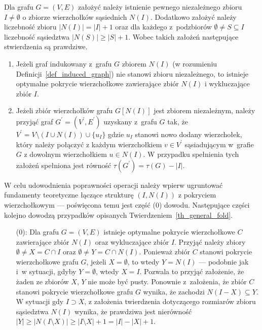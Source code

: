 \par{
  \begin{theorem}
    Dla grafu $G=(V,E)$ założyć należy istnienie pewnego niezależnego zbioru $I\neq \emptyset$ o zbiorze wierzchołków sąsiednich $N(I)$.
    Dodatkowo założyć należy liczebność zbioru $|N(I)|=|I| + 1$ oraz dla każdego z~podzbiorów $\emptyset \neq S \subseteq I$ liczebność sąsiedztwa $|N(S)| \geq |S| + 1$.
    Wobec takich założeń następujące stwierdzenia są prawdziwe.
    \begin{enumerate}
      \item Jeżeli graf indukowany z~grafu $G$ zbiorem $N(I)$ (w rozumieniu Definicji~\ref{def_induced_graph}) nie stanowi zbioru niezależnego, to istnieje optymalne pokrycie wierzchołkowe zawierające zbiór $N(I)$ i wykluczające zbiór $I$.
      \item Jeżeli zbiór wierzchołków grafu $G[N(I)]$ jest zbiorem niezależnym, należy przyjąć graf $G^\prime=(V^\prime, E^\prime)$ uzyskany z~grafu $G$ tak, że $V^\prime=V \setminus (I \cup N(I)) \cup \{u_I\}$ gdzie $u_I$ stanowi nowo dodany wierzchołek, który należy połączyć z każdym wierzchołkiem $v \in V^\prime$ sąsiadującym w~grafie $G$ z dowolnym wierzchołkiem $u \in N(I)$.
      W przypadku spełnienia tych założeń spełniona jest równość $\tau(G^\prime)=\tau(G)-|I|$.
    \end{enumerate}
  \end{theorem}
  \begin{bproof} W celu udowodnienia poprawności operacji należy wpierw ugruntować fundamenty teoretyczne łączące strukturę $(I, N(I))$ z pokryciem wierzchołkowym --- poświęcona temu jest część (0) dowodu.
    Następujące części kolejno dowodzą przypadków opisanych Twierdzeniem~\ref{th_general_fold}.
    \begin{itemize}
      \item[(0):] Dla grafu $G=(V, E)$ istnieje optymalne pokrycie wierzchołkowe $C$ zawierające zbiór $N(I)$ oraz wykluczające zbiór $I$.
      Przyjąć należy zbiory $\emptyset \neq X=C \cap I$ oraz $\emptyset \neq Y=C \cap N(I)$.
      Ponieważ zbiór $C$ stanowi pokrycie wierzchołkowe grafu $G$, jeżeli $X=\emptyset$, to wtedy $Y=N(I)$ --- podobnie jak i~w sytuacji, gdyby $Y=\emptyset$, wtedy $X=I$.
      Pozwala to przyjąć założenie, że żaden ze zbiorów $X$, $Y$ nie może być pusty.
      Ponownie z~założenia, że zbiór $C$ stanowi pokrycie wierzchołkowe grafu $G$ wynika, że zachodzi $N(I-X)\subseteq Y$.
      W sytuacji gdy $I \supset X$, z założenia twierdzenia dotyczącego rozmiarów zbioru sąsiedztwa $N(I)$ wynika, że prawdziwa jest nierówność $|Y| \geq |N(I \setminus X)| \geq |I \setminus X| + 1 = |I| - |X| + 1$.

\end{itemize}
\end{bproof}}
